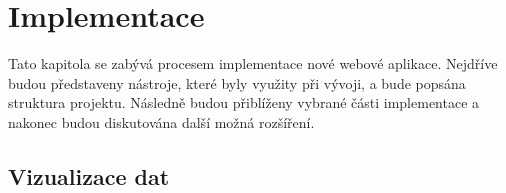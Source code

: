 \chapter{Implementace}
Tato kapitola se zabývá procesem implementace nové webové aplikace. Nejdříve budou představeny nástroje, které byly využity při vývoji, a bude popsána struktura projektu. Následně budou přiblíženy vybrané části implementace a nakonec budou diskutována další možná rozšíření.









\section{Vizualizace dat}


%


